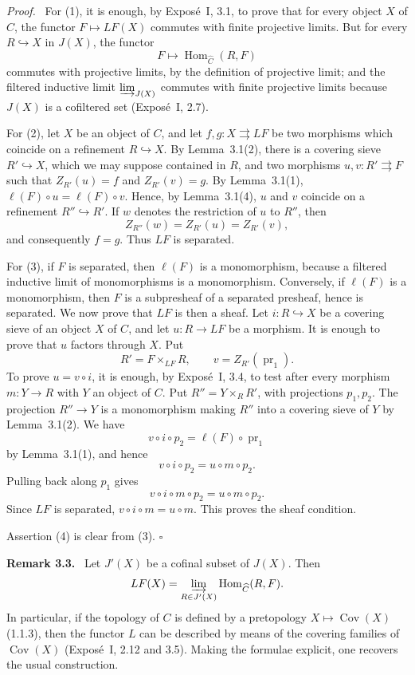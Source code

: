 \documentclass[11pt]{article}
\newcommand{\Hom}{\operatorname{Hom}}
\newcommand{\Cov}{\operatorname{Cov}}
\newcommand{\qedtext}{\hfill\(\square\)}
\newenvironment{remarktext}[1]{\par\medskip\noindent\textbf{#1.}\ }{\par\medskip}
\newenvironment{prooftext}{\par\noindent\emph{Proof.}\ }{\par\medskip}
\begin{document}
\begin{prooftext}
For (1), it is enough, by Expos\'e~I, 3.1, to prove that for every object \(X\) of \(C\), the functor \(F\mapsto LF(X)\) commutes with finite projective limits. But for every \(R\hookrightarrow X\) in \(J(X)\), the functor
\[
F\longmapsto \Hom_{\widehat C}(R,F)
\]
commutes with projective limits, by the definition of projective limit; and the filtered inductive limit \(\varinjlim_{J(X)}\) commutes with finite projective limits because \(J(X)\) is a cofiltered set (Expos\'e~I, 2.7).

For (2), let \(X\) be an object of \(C\), and let \(f,g:X\rightrightarrows LF\) be two morphisms which coincide on a refinement \(R\hookrightarrow X\). By Lemma~3.1(2), there is a covering sieve \(R'\hookrightarrow X\), which we may suppose contained in \(R\), and two morphisms \(u,v:R'\rightrightarrows F\) such that \(Z_{R'}(u)=f\) and \(Z_{R'}(v)=g\). By Lemma~3.1(1), \(\ell(F)\circ u=\ell(F)\circ v\). Hence, by Lemma~3.1(4), \(u\) and \(v\) coincide on a refinement \(R''\hookrightarrow R'\). If \(w\) denotes the restriction of \(u\) to \(R''\), then
\[
Z_{R''}(w)=Z_{R'}(u)=Z_{R'}(v),
\]
and consequently \(f=g\). Thus \(LF\) is separated.

For (3), if \(F\) is separated, then \(\ell(F)\) is a monomorphism, because a filtered inductive limit of monomorphisms is a monomorphism. Conversely, if \(\ell(F)\) is a monomorphism, then \(F\) is a subpresheaf of a separated presheaf, hence is separated. We now prove that \(LF\) is then a sheaf. Let \(i:R\hookrightarrow X\) be a covering sieve of an object \(X\) of \(C\), and let \(u:R\to LF\) be a morphism. It is enough to prove that \(u\) factors through \(X\). Put
\[
R'=F\times_{LF}R,\qquad v=Z_{R'}(\operatorname{pr}_1).
\]
To prove \(u=v\circ i\), it is enough, by Expos\'e~I, 3.4, to test after every morphism \(m:Y\to R\) with \(Y\) an object of \(C\). Put \(R''=Y\times_RR'\), with projections \(p_1,p_2\). The projection \(R''\to Y\) is a monomorphism making \(R''\) into a covering sieve of \(Y\) by Lemma~3.1(2). We have
\[
v\circ i\circ p_2=\ell(F)\circ \operatorname{pr}_1
\]
by Lemma~3.1(1), and hence
\[
v\circ i\circ p_2=u\circ m\circ p_2.
\]
Pulling back along \(p_1\) gives
\[
v\circ i\circ m\circ p_2=u\circ m\circ p_2.
\]
Since \(LF\) is separated, \(v\circ i\circ m=u\circ m\). This proves the sheaf condition.

Assertion (4) is clear from (3). \qedtext
\end{prooftext}

\begin{remarktext}{Remark 3.3}
Let \(J'(X)\) be a cofinal subset of \(J(X)\). Then
\[
LF(X)=\varinjlim_{R\in J'(X)}\Hom_{\widehat C}(R,F).
\]
In particular, if the topology of \(C\) is defined by a pretopology \(X\mapsto \Cov(X)\) (1.1.3), then the functor \(L\) can be described by means of the covering families of \(\Cov(X)\) (Expos\'e~I, 2.12 and 3.5). Making the formulae explicit, one recovers the usual construction.
\end{remarktext}
\end{document}
